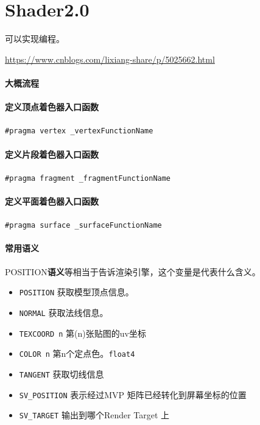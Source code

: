 \documentclass[UTF8,a4paper,12pt]{ctexbook}
\begin{document}
	\section{Shader2.0}
		可以实现编程。
		
		\url{https://www.cnblogs.com/lixiang-share/p/5025662.html}
		
		\paragraph{大概流程}

		
		\paragraph{定义顶点着色器入口函数}
			\verb|#pragma vertex _vertexFunctionName |
			
		\paragraph{定义片段着色器入口函数}
			\verb|#pragma fragment _fragmentFunctionName |

		\paragraph{定义平面着色器入口函数}
			\verb|#pragma surface _surfaceFunctionName |
			
		
		\paragraph{常用语义}
			POSITION\textbf{语义}等相当于告诉渲染引擎，这个变量是代表什么含义。
			
			\begin{itemize}
				\item \verb|POSITION| 获取模型顶点信息。
				\item \verb|NORMAL| 获取法线信息。
				\item \verb|TEXCOORD n| 第(n)张贴图的uv坐标
				\item \verb|COLOR n| 第n个定点色。\verb|float4|
				\item \verb|TANGENT| 获取切线信息
				\item \verb|SV_POSITION| 表示经过MVP 矩阵已经转化到屏幕坐标的位置
				\item \verb|SV_TARGET| 输出到哪个Render Target 上
 			\end{itemize}
		
\end{document}
